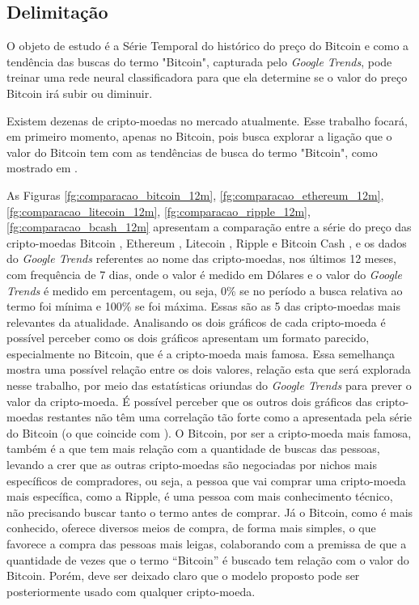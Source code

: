 \subsection{Delimitação}

O objeto de estudo é a Série Temporal do histórico do preço do Bitcoin e como a tendência das buscas do termo "Bitcoin", capturada pelo \textit{Google Trends}, pode treinar uma rede neural classificadora para que ela determine se o valor do preço Bitcoin irá subir ou diminuir.

Existem dezenas de cripto-moedas no mercado atualmente. Esse trabalho focará, em primeiro momento, apenas no Bitcoin, pois busca explorar a ligação que o valor do Bitcoin tem com as tendências de busca do termo "Bitcoin", como mostrado em \cite{matta2015bitcoin}. 

As Figuras \ref{fg:comparacao_bitcoin_12m}, \ref{fg:comparacao_ethereum_12m}, \ref{fg:comparacao_litecoin_12m}, \ref{fg:comparacao_ripple_12m}, \ref{fg:comparacao_bcash_12m} apresentam a comparação entre a série do preço das cripto-moedas Bitcoin \cite{nakamoto2008bitcoin}, Ethereum \cite{Ethereum}, Litecoin \cite{Litecoin}, Ripple \cite{Ripple} e Bitcoin Cash \cite{BitcoinCash}, e os dados do \textit{Google Trends} referentes ao nome das cripto-moedas, nos últimos 12 meses, com frequência de 7 dias, onde o valor é medido em Dólares e o valor do \textit{Google Trends} é medido em percentagem, ou seja, 0\% se no período a busca relativa ao termo foi mínima e 100\% se foi máxima. Essas são as 5 das cripto-moedas mais relevantes da atualidade. 
Analisando os dois gráficos de cada cripto-moeda é possível perceber como os dois gráficos apresentam um formato parecido, especialmente no Bitcoin, que é a cripto-moeda mais famosa. Essa semelhança mostra uma possível relação entre os dois valores, relação esta que será explorada nesse trabalho, por meio das estatísticas oriundas do \textit{Google Trends} para prever o valor da cripto-moeda. É possível perceber que os outros dois gráficos das cripto-moedas restantes não têm uma correlação tão forte como a apresentada pela série do Bitcoin (o que coincide com \cite{matta2015bitcoin}). O Bitcoin, por ser a cripto-moeda mais famosa, também é a que tem mais relação com a quantidade de buscas das pessoas, levando a crer que as outras cripto-moedas são negociadas por nichos mais específicos de compradores, ou seja, a pessoa que vai comprar uma cripto-moeda mais específica, como a Ripple, é uma pessoa com mais conhecimento técnico, não precisando buscar tanto o termo antes de comprar. Já o Bitcoin, como é mais conhecido, oferece diversos meios de compra, de forma mais simples, o que favorece a compra das pessoas mais leigas, colaborando com a premissa de que a quantidade de vezes que o termo ``Bitcoin'' é buscado tem relação com o valor do Bitcoin. Porém, deve ser deixado claro que o modelo proposto pode ser posteriormente usado com qualquer cripto-moeda.

